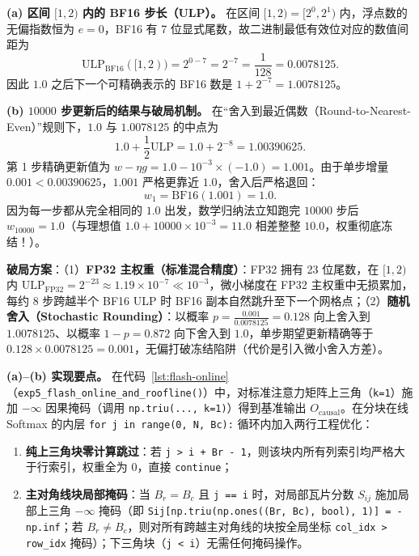 \textbf{(a) 区间 $[1, 2)$ 内的 BF16 步长（ULP）。} 在区间 $[1, 2) = [2^0, 2^1)$ 内，浮点数的无偏指数恒为 $e = 0$，BF16 有 7 位显式尾数，故二进制最低有效位对应的数值间距为
\[
  \mathrm{ULP}_{\mathrm{BF16}}([1, 2)) = 2^{0 - 7} = 2^{-7} = \frac{1}{128} = \mathbf{0.0078125}.
\]
因此 $1.0$ 之后下一个可精确表示的 BF16 数是 $1 + 2^{-7} = 1.0078125$。

\textbf{(b) $10000$ 步更新后的结果与破局机制。} 在“舍入到最近偶数（Round-to-Nearest-Even）”规则下，$1.0$ 与 $1.0078125$ 的中点为
\[
  1.0 + \frac{1}{2}\mathrm{ULP} = 1.0 + 2^{-8} = 1.00390625.
\]
第 1 步精确更新值为 $w - \eta g = 1.0 - 10^{-3}\times(-1.0) = 1.001$。由于单步增量 $0.001 < 0.00390625$，$1.001$ 严格更靠近 $1.0$，舍入后严格退回：
\[
  w_1 = \mathrm{BF16}(1.001) = 1.0.
\]
因为每一步都从完全相同的 $1.0$ 出发，数学归纳法立知跑完 $10000$ 步后 $w_{10000} = \mathbf{1.0}$（与理想值 $1.0 + 10000 \times 10^{-3} = 11.0$ 相差整整 $10.0$，权重彻底冻结！）。

\textbf{破局方案}：（1）\textbf{FP32 主权重（标准混合精度）}：FP32 拥有 23 位尾数，在 $[1, 2)$ 内 $\mathrm{ULP}_{\mathrm{FP32}} = 2^{-23} \approx 1.19 \times 10^{-7} \ll 10^{-3}$，微小梯度在 FP32 主权重中无损累加，每约 8 步跨越半个 BF16 ULP 时 BF16 副本自然跳升至下一个网格点；（2）\textbf{随机舍入（Stochastic Rounding）}：以概率 $p = \frac{0.001}{0.0078125} = 0.128$ 向上舍入到 $1.0078125$、以概率 $1 - p = 0.872$ 向下舍入到 $1.0$，单步期望更新精确等于 $0.128 \times 0.0078125 = 0.001$，无偏打破冻结陷阱（代价是引入微小舍入方差）。


\textbf{(a)--(b) 实现要点。} 在代码~\ref{lst:flash-online}（\texttt{exp5\_flash\_\allowbreak online\_and\_roofline()}）中，对标准注意力矩阵上三角（\texttt{k=1}）施加 $-\infty$ 因果掩码（调用 \texttt{np.triu(..., k=1)}）得到基准输出 $O_{\mathrm{causal}}$。在分块在线 Softmax 的内层 \texttt{for j in range(0, N, Bc):} 循环内加入两行工程优化：
\begin{enumerate}
  \item \textbf{纯上三角块零计算跳过}：若 \texttt{j > i + Br - 1}，则该块内所有列索引均严格大于行索引，权重全为 $0$，直接 \texttt{continue}；
  \item \textbf{主对角线块局部掩码}：当 $B_r = B_c$ 且 \texttt{j == i} 时，对局部瓦片分数 $S_{ij}$ 施加局部上三角 $-\infty$ 掩码（即 \texttt{Sij[np.triu(\allowbreak np.ones((Br, Bc), bool), 1)] = -np.inf}；若 $B_r \neq B_c$，则对所有跨越主对角线的块按全局坐标 \texttt{col\_idx > row\_idx} 掩码）；下三角块（\texttt{j < i}）无需任何掩码操作。
\end{enumerate}

